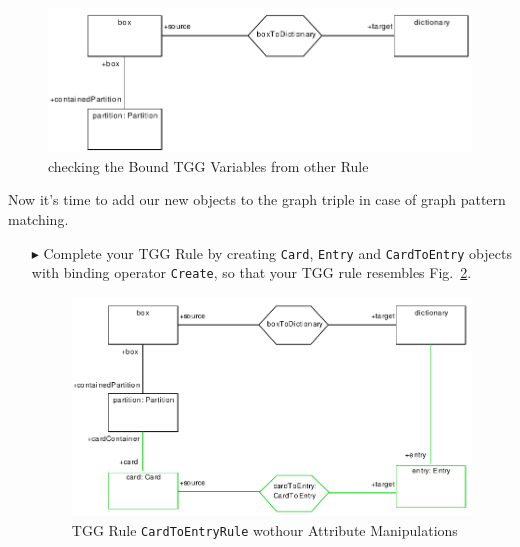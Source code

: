\begin{enumerate}
\begin{figure}[htbp]
\begin{center}
  \includegraphics[width=\textwidth]{pics/tggBilder/tggRule/tgg18}
  \caption{checking the Bound TGG Variables from other Rule }  
  \label{fig:check_bound_variables}
\end{center}
\end{figure}

\end{enumerate}

\clearpage

Now it's time to add our new objects to the graph triple in case of graph pattern matching. 

\begin{enumerate}
\item[$\blacktriangleright$] Complete your TGG Rule by creating \texttt{Card}, \texttt{Entry} and \texttt{CardToEntry} objects with binding operator \texttt{Create}, so that your TGG rule resembles Fig.~\ref{fig:cardtoentry_1}.

\begin{figure}[htbp]
\begin{center}
  \includegraphics[width=\textwidth]{pics/tggBilder/tggRule/tgg19}
  \caption{TGG Rule \texttt{CardToEntryRule} wothour Attribute Manipulations}  
  \label{fig:cardtoentry_1}
\end{center}
\end{figure}

\end{enumerate}

